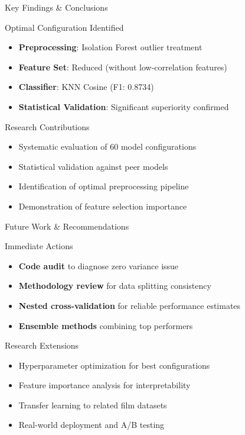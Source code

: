 \documentclass[10pt]{beamer}
\begin{document}
{\begin{frame}{Key Findings \& Conclusions}
\begin{block}{Optimal Configuration Identified}
\begin{itemize}
    \item \textbf{Preprocessing}: Isolation Forest outlier treatment
    \item \textbf{Feature Set}: Reduced (without low-correlation features)  
    \item \textbf{Classifier}: KNN Cosine (F1: 0.8734)
    \item \textbf{Statistical Validation}: Significant superiority confirmed
\end{itemize}
\end{block}

\begin{block}{Research Contributions}
\begin{itemize}
    \item Systematic evaluation of 60 model configurations
    \item Statistical validation against peer models
    \item Identification of optimal preprocessing pipeline
    \item Demonstration of feature selection importance
\end{itemize}
\end{block}
\end{frame}

\begin{frame}{Future Work \& Recommendations}
\begin{block}{Immediate Actions}
\begin{itemize}
    \item \textbf{Code audit} to diagnose zero variance issue
    \item \textbf{Methodology review} for data splitting consistency
    \item \textbf{Nested cross-validation} for reliable performance estimates
    \item \textbf{Ensemble methods} combining top performers
\end{itemize}
\end{block}

\begin{block}{Research Extensions}
\begin{itemize}
    \item Hyperparameter optimization for best configurations
    \item Feature importance analysis for interpretability
    \item Transfer learning to related film datasets
    \item Real-world deployment and A/B testing
\end{itemize}
\end{block}
\end{frame}

}
\end{document}
